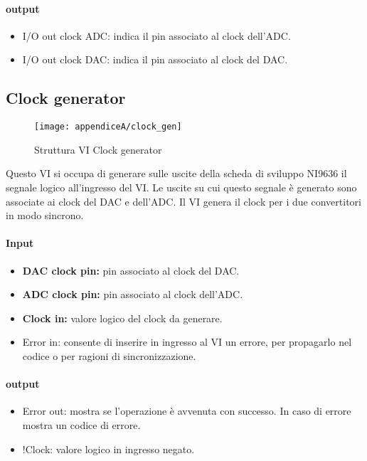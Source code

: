 \paragraph{output}
\begin{itemize}
	\item I/O out clock ADC: indica il pin associato al clock dell'ADC.
	\item I/O out clock DAC: indica il pin associato al clock del DAC.
\end{itemize}

\subsection{Clock generator}

\begin{figure}[H]
	\begin{center}
		\texttt{[image: appendiceA/clock\_gen]}
		\caption{Struttura VI Clock generator}
	\end{center}
\end{figure}

Questo VI si occupa di generare sulle uscite della scheda di sviluppo NI9636 il segnale logico all'ingresso del VI. Le uscite su cui questo segnale è generato sono associate ai clock del DAC e dell'ADC. Il VI genera il clock per i due convertitori in modo sincrono.

\paragraph{Input}
\begin{itemize}
	\item \textbf{DAC clock pin:} pin associato al clock del DAC.
	\item \textbf{ADC clock pin:} pin associato al clock dell'ADC.
	\item \textbf{Clock in:} valore logico del clock da generare.
	\item Error in: consente di inserire in ingresso al VI un errore, per propagarlo nel codice o per ragioni di sincronizzazione.
\end{itemize}

\paragraph{output}
\begin{itemize}
	\item Error out: mostra se l'operazione è avvenuta con successo. In caso di errore mostra un codice di errore.
	\item !Clock: valore logico in ingresso negato.
\end{itemize}

